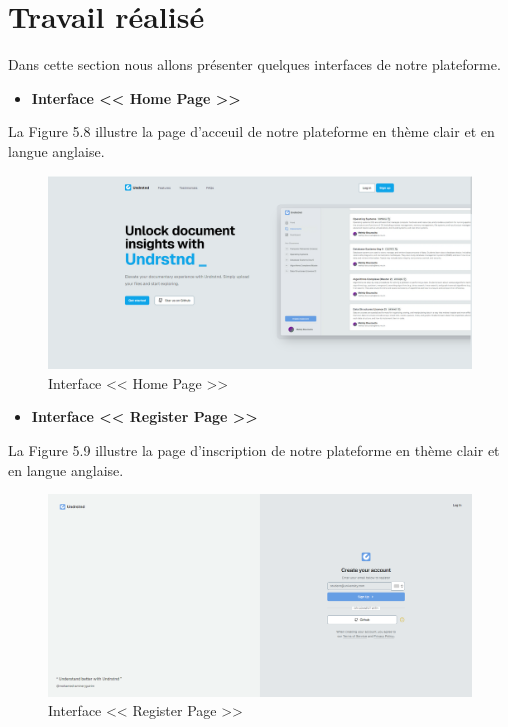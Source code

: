 \newpage
\section{Travail réalisé }
Dans cette section nous allons présenter quelques interfaces de notre plateforme.
\begin{itemize}
    \item \textbf{Interface << Home Page >>}
\end{itemize}
La Figure 5.8 illustre la page d'acceuil de notre plateforme en thème clair et en langue anglaise.
\begin{figure}[H]
    \centering
    \includegraphics[width=1.1\textwidth,height=0.45\textwidth]{images/chp5/fig8.png}
    \caption{Interface << Home Page >>}
    \label{Interface << Home Page >>}    
\end{figure} 
\begin{itemize}
    \item \textbf{Interface << Register Page >>}
\end{itemize}
La Figure 5.9 illustre la page d'inscription de notre plateforme en thème clair et en langue anglaise.
\begin{figure}[H]
    \centering
    \includegraphics[width=1.1\textwidth,height=0.45\textwidth]{images/chp5/fig9.png}
    \caption{Interface << Register Page >>}
    \label{Interface << Register Page >>}    
\end{figure}
